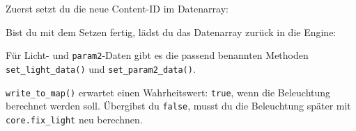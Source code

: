 Zuerst setzt du die neue Content-ID im Datenarray:

\begin{Shaded}
\begin{Highlighting}[]
  \OperatorTok{=} \OperatorTok{(}\OperatorTok{)}

  \OperatorTok{=} \OperatorTok{,}  
      \OperatorTok{=} \OperatorTok{,}  
          \OperatorTok{=} \OperatorTok{,}  
              \OperatorTok{=} \OperatorTok{:}\OperatorTok{(}\OperatorTok{,} \OperatorTok{,} \OperatorTok{)}
             \OperatorTok{[}\OperatorTok{]} \OperatorTok{==}  
                \OperatorTok{[}\OperatorTok{]} \OperatorTok{=} 
\end{Highlighting}
\end{Shaded}

Bist du mit dem Setzen fertig, lädst du das Datenarray zurück in die
Engine:

\begin{Shaded}
\begin{Highlighting}[]
\OperatorTok{:}\OperatorTok{(}\OperatorTok{)}
\OperatorTok{:}\OperatorTok{(}\OperatorTok{)}
\end{Highlighting}
\end{Shaded}

Für Licht- und \texttt{param2}-Daten gibt es die passend benannten
Methoden \texttt{set\_\allowbreak{}light\_\allowbreak{}data()} und
\texttt{set\_\allowbreak{}param2\_\allowbreak{}data()}.

\texttt{write\_\allowbreak{}to\_\allowbreak{}map()} erwartet einen
Wahrheitswert: \texttt{true}, wenn die Beleuchtung berechnet werden
soll. Übergibst du \texttt{false}, musst du die Beleuchtung später mit
\texttt{core.\allowbreak{}fix\_\allowbreak{}light}
neu berechnen.

